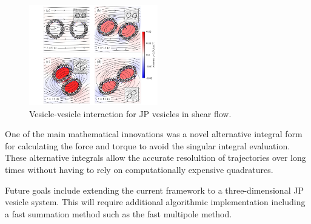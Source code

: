 \begin{figure}
\includegraphics[width=0.5\textwidth]{figures/PreliminaryWork/ShearDoublet.pdf}
\caption{Vesicle-vesicle interaction for JP vesicles in shear flow.}
\end{figure}
One of the main mathematical innovations was a novel alternative integral
form for calculating the force and torque to avoid the singular integral
evaluation. These alternative integrals allow the accurate resolultion
of trajectories over long times without having to rely on computationally
expensive quadratures.

Future goals include extending the current framework to a
three-dimensional JP vesicle system. This will require additional
algorithmic implementation including a fast summation method such as the
fast multipole method.


